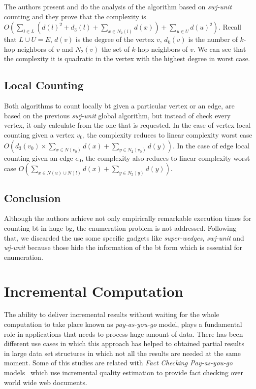 The authors present and do the analysis of the algorithm based on \emph{swj-unit} counting and they prove that the complexity is $O(\sum_{l \in L} (d(l)^2+d_3(l) + \sum_{x \in N_2(l)} d(x)) + \sum_{u \in U} d(u)^2)$.
Recall that $L \cup U = E$, $d(v)$ is the degree of the vertex $v$, $d_k(v)$ is the number of $k$-hop neighbors of $v$ and $N_2(v)$ the set of $k$-hop neighbors of $v$.
We can see that the complexity it is quadratic in the vertex with the highest degree in worst case.

\subsection{Local Counting}
Both algorithms to count locally \acrshort{bt} given a particular vertex or an edge, are based on the previous \emph{swj-unit} global algorithm, 
but instead of check every vertex, it only calculate from the one that is requested. 
In the case of vertex local counting given a vertex $v_0$, the complexity reduces to linear complexity worst case $O(d_3(v_0) \times \sum_{x \in N(v_0)} d(x) + \sum_{y \in N_2(v_0)} d(y))$.
In the case of edge local counting given an edge $e_0$, the complexity also reduces to linear complexity worst case $O(\sum_{x \in N(u) \cup N(l)} d(x) + \sum_{y \in N_2(y)} d(y))$.

\subsection{Conclusion}
Although the authors achieve not only empirically remarkable execution times for counting \acrshort{bt} in huge \acrshort{bg}, the enumeration problem is not addressed. 
Following that, we discarded the use some specific gadgets like \emph{super-wedges}, \emph{swj-unit} and \emph{wj-unit} because those hide the information of the \acrshort{bt}
form which is essential for enumeration.

\section{Incremental Computation}
The ability to deliver incremental results without waiting for the whole computation to take place known as \emph{pay-as-you-go} model, plays a fundamental role in applications that needs to process huge amount of data. 
There has been different use cases in which this approach has helped to obtained partial results in large data set structures in which not all the results are needed at the same moment.
Some of this studies are related with \emph{Fact Checking Pay-as-you-go} models~\cite{factcatch} which use incremental quality estimation to provide fact checking over world wide web documents.

